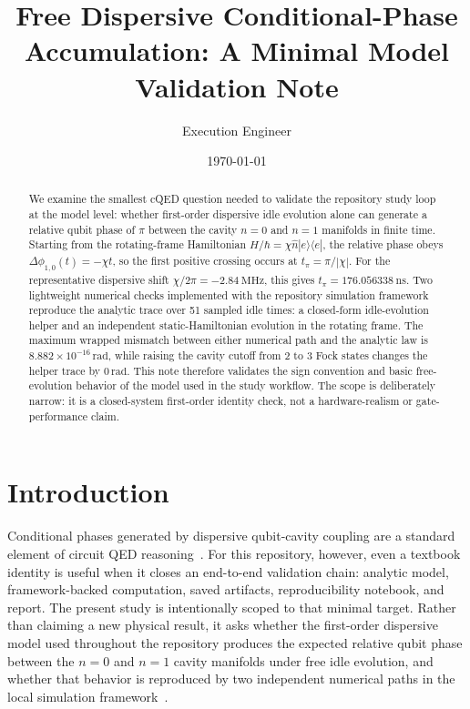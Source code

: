 \documentclass[aps,pra,twocolumn,reprint,amsmath,amssymb]{revtex4-2}
\begin{document}
\title{Free Dispersive Conditional-Phase Accumulation: A Minimal Model Validation Note}
\author{Execution Engineer}
\date{\today}

\begin{abstract}
We examine the smallest cQED question needed to validate the repository study loop at the model level: whether first-order dispersive idle evolution alone can generate a relative qubit phase of $\pi$ between the cavity $n=0$ and $n=1$ manifolds in finite time. Starting from the rotating-frame Hamiltonian $H/\hbar = \chi \hat{n} |e\rangle\langle e|$, the relative phase obeys $\Delta\phi_{1,0}(t) = -\chi t$, so the first positive crossing occurs at $t_{\pi} = \pi/|\chi|$. For the representative dispersive shift $\chi/2\pi = \SI{-2.84}{\mega\hertz}$, this gives $t_{\pi} = \SI{176.056338}{\nano\second}$. Two lightweight numerical checks implemented with the repository simulation framework reproduce the analytic trace over 51 sampled idle times: a closed-form idle-evolution helper and an independent static-Hamiltonian evolution in the rotating frame. The maximum wrapped mismatch between either numerical path and the analytic law is $8.882\times 10^{-16}\,\mathrm{rad}$, while raising the cavity cutoff from 2 to 3 Fock states changes the helper trace by $0\,\mathrm{rad}$. This note therefore validates the sign convention and basic free-evolution behavior of the model used in the study workflow. The scope is deliberately narrow: it is a closed-system first-order identity check, not a hardware-realism or gate-performance claim.
\end{abstract}

\maketitle

\section{Introduction}
Conditional phases generated by dispersive qubit-cavity coupling are a standard element of circuit QED reasoning~\cite{blais2004cavity,koch2007transmon}. For this repository, however, even a textbook identity is useful when it closes an end-to-end validation chain: analytic model, framework-backed computation, saved artifacts, reproducibility notebook, and report. The present study is intentionally scoped to that minimal target. Rather than claiming a new physical result, it asks whether the first-order dispersive model used throughout the repository produces the expected relative qubit phase between the $n=0$ and $n=1$ cavity manifolds under free idle evolution, and whether that behavior is reproduced by two independent numerical paths in the local simulation framework~\cite{cqedsim2025}.
\end{document}
